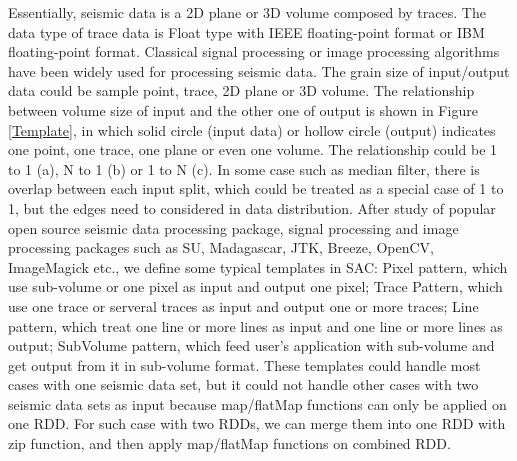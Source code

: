 
Essentially, seismic data is a 2D plane or 3D volume composed by traces. The data type of trace data is Float type with IEEE floating-point format or IBM floating-point format. Classical signal processing or image processing algorithms have been widely used for processing seismic data. The grain size of input/output data could be sample point, trace, 2D plane or 3D volume. The relationship between volume size of input and the other one of output is shown in Figure \ref{Template}, in which solid circle (input data) or hollow circle (output) indicates one point, one trace, one plane or even one volume. The relationship could be 1 to 1 (a), N to 1 (b) or 1 to N (c). In some case such as median filter, there is overlap between each input split, which could be treated as a special case of 1 to 1, but the edges need to considered in data distribution. After study of popular open source seismic data processing package, signal processing and image processing packages such as SU, Madagascar, JTK, Breeze, OpenCV, ImageMagick etc., we define some typical templates in SAC: Pixel pattern, which use sub-volume or one pixel as input and output one pixel; Trace Pattern, which use one trace or serveral traces as input and output one or more traces; Line pattern, which treat one line or more lines as input and one line or more lines as output; SubVolume pattern, which feed user’s application with sub-volume and get output from it in sub-volume format. These templates could handle most cases with one seismic data set, but it could not handle other cases with two seismic data sets as input because map/flatMap functions can only be applied on one RDD. For such case with two RDDs, we can merge them into one RDD with zip function, and then apply map/flatMap functions on combined RDD. 

